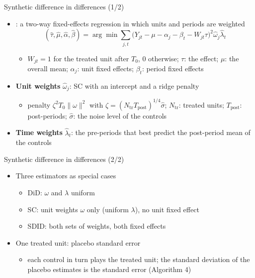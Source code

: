 \begin{frame}{Synthetic difference in differences (1/2)}
\itemsize{\small}
\begin{itemize}
    \item {}: a two-way fixed-effects regression in which units and periods are weighted \[ (\hat\tau, \hat\mu, \hat\alpha, \hat\beta) = \arg\min\sum_{j,t}\big(Y_{jt} - \mu - \alpha_j - \beta_t - W_{jt}\tau\big)^2\hat\omega_j\hat\lambda_t \]
    \begin{itemize}
        \item $W_{jt} = 1$ for the treated unit after $T_0$, 0 otherwise; $\tau$: the effect; $\mu$: the overall mean; $\alpha_j$: unit fixed effects; $\beta_t$: period fixed effects
    \end{itemize}
    \item \textbf{Unit weights} $\hat\omega_j$: SC with an intercept and a ridge penalty
    \begin{itemize}
        \item penalty $\zeta^2T_0\|\omega\|^2$ with $\zeta = (N_{\mathrm{tr}}T_{\mathrm{post}})^{1/4}\hat\sigma$; $N_{\mathrm{tr}}$: treated units; $T_{\mathrm{post}}$: post-periods; $\hat\sigma$: the noise level of the controls
    \end{itemize}
    \item \textbf{Time weights} $\hat\lambda_t$: the pre-periods that best predict the post-period mean of the controls
\end{itemize}
\end{frame}

\begin{frame}{Synthetic difference in differences (2/2)}
\itemsize{\small}
\begin{itemize}
    \item Three estimators as special cases
    \begin{itemize}
        \item DiD: $\omega$ and $\lambda$ uniform
        \item SC: unit weights $\omega$ only (uniform $\lambda$), no unit fixed effect
        \item SDID: both sets of weights, both fixed effects
    \end{itemize}
    \item One treated unit: placebo standard error
    \begin{itemize}
        \item each control in turn plays the treated unit; the standard deviation of the placebo estimates is the standard error (Algorithm 4)
    \end{itemize}
\end{itemize}
\end{frame}

